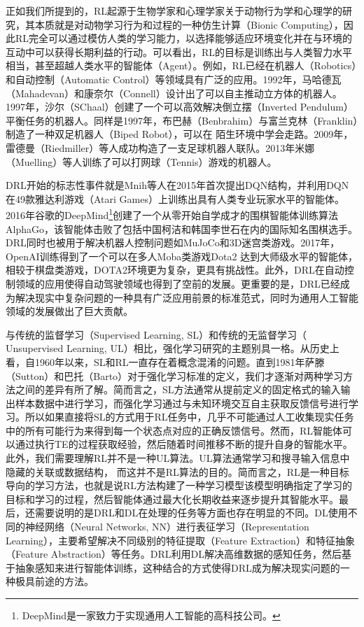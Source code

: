 正如我们所提到的，RL起源于生物学家和心理学家关于动物行为学和心理学的研究，其本质就是对动物学习行为和过程的一种仿生计算（Bionic Computing），因此RL完全可以通过模仿人类的学习能力，以选择能够适应环境变化并在与环境的互动中可以获得长期利益的行动。可以看出，RL的目标是训练出与人类智力水平相当，甚至超越人类水平的智能体（Agent）。例如，RL已经在机器人（Robotics）和自动控制（Automatic Control）等领域具有广泛的应用。1992年，马哈德瓦（Mahadevan）和康奈尔（Connell）设计出了可以自主推动立方体的机器人。1997年，沙尔（SChaal）创建了一个可以高效解决倒立摆（Inverted Pendulum）平衡任务的机器人。同样是1997年，布巴赫（Benbrahim）与富兰克林（Franklin）制造了一种双足机器人（Biped Robot），可以在
陌生环境中学会走路。2009年，雷德曼（Riedmiller）等人成功构造了一支足球机器人联队。2013年米娜（Muelling）等人训练了可以打网球（Tennis）游戏的机器人。

DRL开始的标志性事件就是Mnih等人在2015年首次提出DQN结构，并利用DQN在49款雅达利游戏（Atari Games）上训练出具有人类专业玩家水平的智能体。2016年谷歌的DeepMind\footnote{DeepMind是一家致力于实现通用人工智能的高科技公司。}创建了一个从零开始自学成才的围棋智能体训练算法AlphaGo，该智能体击败了包括中国柯洁和韩国李世石在内的国际知名围棋选手。DRL同时也被用于解决机器人控制问题如MuJoCo和3D迷宫类游戏。2017年，OpenAI训练得到了一个可以在多人Moba类游戏Dota2
达到大师级水平的智能体，相较于棋盘类游戏，DOTA2环境更为复杂，更具有挑战性。此外，DRL在自动控制领域的应用使得自动驾驶领域也得到了空前的发展。更重要的是，DRL已经成为解决现实中复杂问题的一种具有广泛应用前景的标准范式，同时为通用人工智能领域的发展做出了巨大贡献。

与传统的监督学习（Supervised Learning, SL）和传统的无监督学习（ Unsupervised Learning, UL）相比，强化学习研究的主题别具一格。从历史上看，自1960年以来，SL和RL一直存在着概念混淆的问题。直到1981年萨滕（Sutton）和巴托（Barto）对于强化学习标准的定义，我们才逐渐对两种学习方法之间的差异有所了解。简而言之，SL方法通常从提前定义的固定格式的输入输出样本数据中进行学习，而强化学习通过与未知环境交互自主获取反馈信号进行学习。所以如果直接将SL的方式用于RL任务中，几乎不可能通过人工收集现实任务中的所有可能行为来得到每一个状态点对应的正确反馈信号。然而，RL智能体可以通过执行TE的过程获取经验，然后随着时间推移不断的提升自身的智能水平。此外，我们需要理解RL并不是一种UL算法。UL算法通常学习和搜寻输入信息中隐藏的关联或数据结构，
而这并不是RL算法的目的。简而言之，RL是一种目标导向的学习方法，也就是说RL方法构建了一种学习模型该模型明确指定了学习的目标和学习的过程，然后智能体通过最大化长期收益来逐步提升其智能水平。最后，还需要说明的是DRL和DL在处理的任务等方面也存在明显的不同。DL使用不同的神经网络（Neural Networks, NN）进行表征学习（Representation Learning），主要希望解决不同级别的特征提取（Feature Extraction）和特征抽象（Feature Abstraction）等任务。DRL利用DL解决高维数据的感知任务，然后基于抽象感知来进行智能体训练，这种结合的方式使得DRL成为解决现实问题的一种极具前途的方法。

